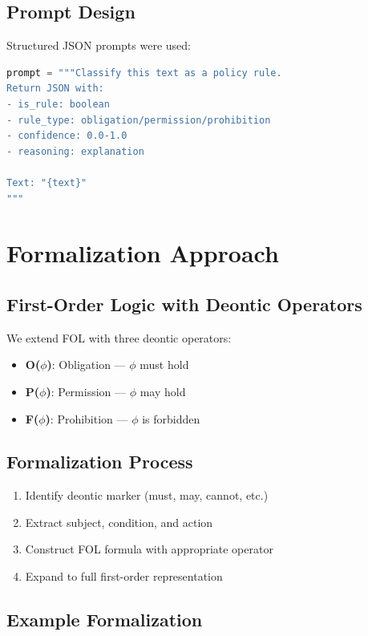 \subsection{Prompt Design}

Structured JSON prompts were used:

\begin{lstlisting}[language=Python]
prompt = """Classify this text as a policy rule.
Return JSON with:
- is_rule: boolean
- rule_type: obligation/permission/prohibition
- confidence: 0.0-1.0
- reasoning: explanation

Text: "{text}"
"""
\end{lstlisting}

\section{Formalization Approach}

\subsection{First-Order Logic with Deontic Operators}

We extend FOL with three deontic operators:

\begin{itemize}
    \item \textbf{O($\phi$)}: Obligation --- $\phi$ must hold
    \item \textbf{P($\phi$)}: Permission --- $\phi$ may hold
    \item \textbf{F($\phi$)}: Prohibition --- $\phi$ is forbidden
\end{itemize}

\subsection{Formalization Process}

\begin{enumerate}
    \item Identify deontic marker (must, may, cannot, etc.)
    \item Extract subject, condition, and action
    \item Construct FOL formula with appropriate operator
    \item Expand to full first-order representation
\end{enumerate}

\subsection{Example Formalization}

